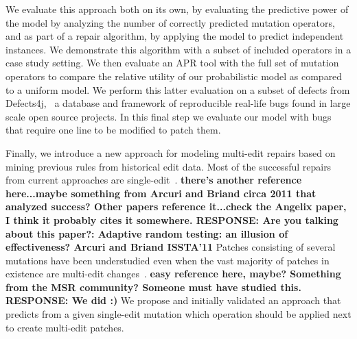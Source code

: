 \documentclass[conference]{IEEEtran}
\newcommand{\todo}[1]
  {{\scriptsize \textbf{\color{red} {#1}}}}
\begin{document}
We evaluate this approach both on its own, by evaluating the predictive power of
the model by analyzing the number of correctly predicted mutation
operators,
and as part of a repair algorithm, by applying the model to predict independent
instances. We demonstrate this algorithm with a subset of included operators in
a case study setting.  We then evaluate an APR tool with the full set of mutation
operators to compare the relative utility of our probabilistic model as compared
to a uniform model.  We perform this latter evaluation on a subset of defects
from Defects4j,~\cite{just14} a 
database and framework of reproducible real-life bugs found in large scale open 
source projects. In this final step we evaluate our model with bugs that require 
one line to be modified to patch them. 

Finally, we introduce a new approach for modeling multi-edit repairs based on
mining previous rules from historical edit data. Most of the
successful repairs from current approaches are
single-edit~\cite{Weimer13,Qi15,kim2013}.\todo{there's another reference
  here...maybe something from Arcuri and Briand circa 2011 that analyzed
  success?  Other papers reference it...check the Angelix paper, I think it
  probably cites it somewhere. RESPONSE: Are you talking about this paper?: Adaptive random testing: an illusion of effectiveness? Arcuri and Briand ISSTA'11}  Patches
consisting of several mutations have been understudied even when the vast majority
of patches in existence are multi-edit changes~\cite{Soto15}.\todo{easy reference here, maybe?
   Something from the MSR community?  Someone must have studied this. RESPONSE: We did :)}  We
 propose and initially validated an approach that predicts from a given 
single-edit mutation which operation should be applied
next to create multi-edit patches. 
\end{document}
